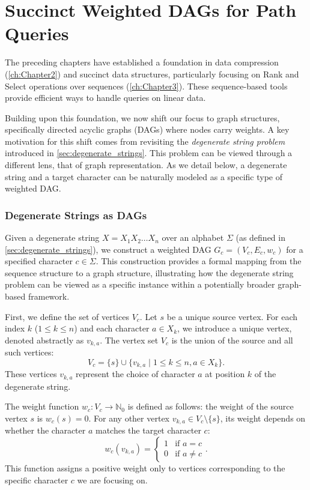 \chapter{Succinct Weighted DAGs for Path Queries}
\label{chap:succinct_dags}

The preceding chapters have established a foundation in data compression (\autoref{ch:Chapter2}) and succinct data structures, particularly focusing on Rank and Select operations over sequences (\autoref{ch:Chapter3}). These sequence-based tools provide efficient ways to handle queries on linear data.

Building upon this foundation, we now shift our focus to graph structures, specifically directed acyclic graphs (DAGs) where nodes carry weights. A key motivation for this shift comes from revisiting the \emph{degenerate string problem} introduced in \autoref{sec:degenerate_strings}. This problem can be viewed through a different lens, that of graph representation. As we detail below, a degenerate string and a target character can be naturally modeled as a specific type of weighted DAG.

\subsection*{Degenerate Strings as DAGs}
\label{subsec:dag_from_degenerate}

Given a degenerate string $X = X_1 X_2 \dots X_n$ over an alphabet $\Sigma$ (as defined in \autoref{sec:degenerate_strings}), we construct a weighted DAG $G_c = (V_c, E_c, w_c)$ for a specified character $c \in \Sigma$. This construction provides a formal mapping from the sequence structure to a graph structure, illustrating how the degenerate string problem can be viewed as a specific instance within a potentially broader graph-based framework.

First, we define the set of vertices $V_c$. Let $s$ be a unique source vertex. For each index $k$ ($1 \le k \le n$) and each character $a \in X_k$, we introduce a unique vertex, denoted abstractly as $v_{k,a}$. The vertex set $V_c$ is the union of the source and all such vertices:
\[ V_c = \{s\} \cup \{ v_{k,a} \mid 1 \le k \le n, a \in X_k \}. \]
These vertices $v_{k,a}$ represent the choice of character $a$ at position $k$ of the degenerate string.

The weight function $w_c: V_c \to \mathbb{N}_0$ is defined as follows: the weight of the source vertex $s$ is $w_c(s) = 0$. For any other vertex $v_{k,a} \in V_c \setminus \{s\}$, its weight depends on whether the character $a$ matches the target character $c$:
\[ w_c(v_{k,a}) = \begin{cases} 1 & \text{if } a = c \\ 0 & \text{if } a \neq c \end{cases}. \]
This function assigns a positive weight only to vertices corresponding to the specific character $c$ we are focusing on.

